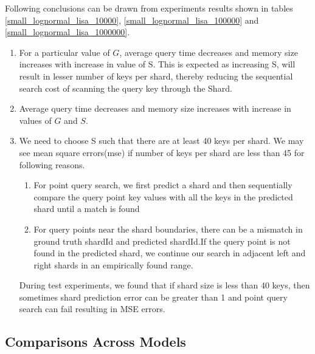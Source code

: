 \begin{mscconclusion}
	Following conclusions can be drawn from experiments results shown in tables \ref{small_lognormal_lisa_10000}, \ref{small_lognormal_lisa_100000} and \ref{small_lognormal_lisa_1000000}. 
\begin{enumerate}

    \item For a particular value of $G$, average query time decreases and memory size increases with increase in value of S. This is expected as increasing S, will result in lesser number of keys per shard, thereby reducing the sequential search cost of scanning the query key through the Shard. 
    
    \item Average query time decreases and memory size increases with increase in values of $G$ and $S$. 
	
	\item We need to choose S such that there are at least 40 keys per shard. We may see mean square errors(mse) if number of keys per shard are less than 45 for following reasons. 
	\begin{enumerate}
	    \item For point query search, we first predict a shard and then sequentially compare the query point key values with all the keys in the predicted shard until a match is found
		\item For query points near the shard boundaries, there can be a mismatch in ground truth shardId and predicted shardId.If the query point is not found in the predicted shard, we continue our search in adjacent left and right shards in an empirically found range.
	\end{enumerate}
	
	During test experiments, we found that if shard size is less than 40 keys, then sometimes shard prediction error can be greater than 1 and point query search can fail resulting in MSE errors.  
\end{enumerate}
\end{mscconclusion}

\subsection{Comparisons Across Models}

